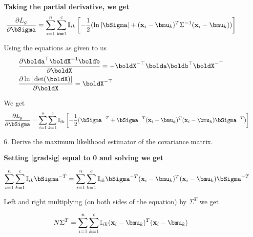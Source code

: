 \documentclass[submit]{harvardml}
\newenvironment{answer}{%
    \color{answergreen}\bf}
  {%
  }
\begin{document}
\begin{enumerate}
\begin{answer}
        Taking the partial derivative, we get 
        \begin{equation}
        \frac{\partial L_g}{\partial \bSigma} = 
            \sum_{i=1}^n \sum_{k=1}^c \mBI \left[ 
            -\frac{1}{2} (
                \ln|\bSigma|+(\bx_i-\bmu_k)^T\Sigma^{-1} (\bx_i-\bmu_k) )
                \right] 
        \end{equation}

        Using the equations as given to us
    \begin{align*}
      & \frac{\partial \bolda^\top \boldX^{-1} \boldb}{\partial \boldX} = - \boldX^{-\top} \bolda \boldb^\top \boldX^{-\top} \\
      & \frac{\partial \ln | \det (\boldX) |}{\partial \boldX} = \boldX^{-\top}
     \end{align*}

     We get 
        \begin{equation}
        \frac{\partial L_g}{\partial \bSigma} = 
            \sum_{i=1}^n \sum_{k=1}^c \mBI \left[ 
            -\frac{1}{2} (
            \bSigma^{-T} + \bSigma^{-T} (\bx_i - \bmu_k)^T (\bx_i - \bmu_k)
            \bSigma^{-T} )
                \right]  \label{gradsig}
        \end{equation}

 \end{answer}
  \item[6.] Derive the maximum likelihood estimator of the covariance matrix.

      \begin{answer}
      Setting  \eqref{gradsig} equal to 0 and solving we get 

        \begin{equation}
            \sum_{i=1}^n \sum_{k=1}^c \mBI \bSigma^{-T} =
            \sum_{i=1}^n \sum_{k=1}^c \mBI \bSigma^{-T} (\bx_i - \bmu_k)^T (\bx_i - \bmu_k)
            \bSigma^{-T} 
        \end{equation}

        Left and right multiplying (on both sides of the equation) by
        $\Sigma^{T}$ we get 

        $$
          N \Sigma ^T =  
            \sum_{i=1}^n \sum_{k=1}^c \mBI (\bx_i - \bmu_k)^T (\bx_i - \bmu_k)
            $$


\end{answer}
\end{enumerate}
\end{document}
